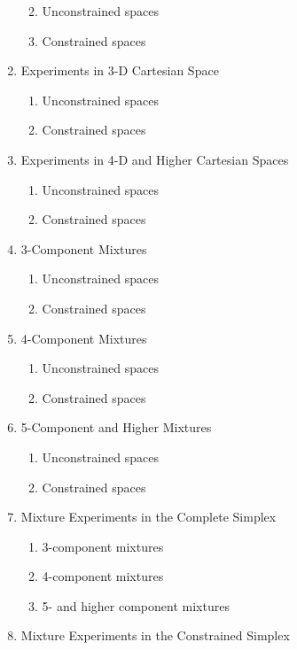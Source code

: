 \documentclass[
  letterpaper,
  DIV=11,
  numbers=noendperiod]{scrreprt}
\begin{document}
\begin{enumerate}
  \begin{enumerate}
  \def\labelenumii{\arabic{enumii}.}
  \item
    Unconstrained spaces
  \item
    Constrained spaces
  \end{enumerate}
\item
  Experiments in 3-D Cartesian Space

  \begin{enumerate}
  \def\labelenumii{\arabic{enumii}.}
  \item
    Unconstrained spaces
  \item
    Constrained spaces
  \end{enumerate}
\item
  Experiments in 4-D and Higher Cartesian Spaces

  \begin{enumerate}
  \def\labelenumii{\arabic{enumii}.}
  \item
    Unconstrained spaces
  \item
    Constrained spaces
  \end{enumerate}
\item
  3-Component Mixtures

  \begin{enumerate}
  \def\labelenumii{\arabic{enumii}.}
  \item
    Unconstrained spaces
  \item
    Constrained spaces
  \end{enumerate}
\item
  4-Component Mixtures

  \begin{enumerate}
  \def\labelenumii{\arabic{enumii}.}
  \item
    Unconstrained spaces
  \item
    Constrained spaces
  \end{enumerate}
\item
  5-Component and Higher Mixtures

  \begin{enumerate}
  \def\labelenumii{\arabic{enumii}.}
  \item
    Unconstrained spaces
  \item
    Constrained spaces
  \end{enumerate}
\item
  Mixture Experiments in the Complete Simplex

  \begin{enumerate}
  \def\labelenumii{\arabic{enumii}.}
  \item
    3-component mixtures
  \item
    4-component mixtures
  \item
    5- and higher component mixtures
  \end{enumerate}
\item
  Mixture Experiments in the Constrained Simplex


\end{enumerate}
\end{document}
